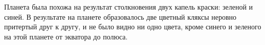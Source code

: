 Планета была похожа на результат столкновения двух капель краски: зеленой и синей. 
В результате на планете образовалось две цветный кляксы неровно притертый друг к другу,
 и не было видно ни одно цвета, кроме синего и зеленого на этой планете от экватора до полюса.